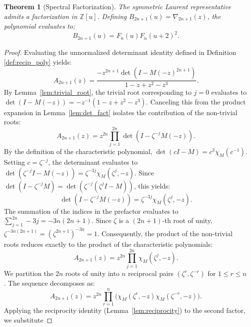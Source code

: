 \documentclass[11pt]{article}
\newtheorem{theorem}{Theorem}[section]
\begin{document}
\begin{theorem}[Spectral Factorization]\label{thm:spectral_fact}
The symmetric Laurent representative admits a factorization in $\mathbb{Z}[u]$. Defining $B_{2n+1}(u) = \nabla_{2n+1}(z)$, the polynomial evaluates to:
\begin{equation}
B_{2n+1}(u) = F_n(u)F_n(u+2)^2.
\end{equation}
\end{theorem}

\begin{proof}
Evaluating the unnormalized determinant identity defined in Definition \ref{def:recip_poly} yields:
\begin{equation*}
A_{2n+1}(z) = \frac{-z^{2n+1} \det(I - M(-z)^{2n+1})}{1-z+z^2-z^3}.
\end{equation*}
By Lemma~\ref{lem:trivial_root}, the trivial root corresponding to $j=0$ evaluates to $\det(I-M(-z)) = -z^{-1}(1-z+z^2-z^3)$. Canceling this from the product expansion in Lemma~\ref{lem:det_fact} isolates the contribution of the non-trivial roots:
\begin{equation*}
A_{2n+1}(z) = z^{2n} \prod_{j=1}^{2n} \det(I - \zeta^{-j}M(-z)).
\end{equation*}
By the definition of the characteristic polynomial, $\det(cI - M) = c^3\chi_M(c^{-1})$. Setting $c = \zeta^{-j}$, the determinant evaluates to $\det(\zeta^{-j}I - M(-z)) = \zeta^{-3j}\chi_M(\zeta^j, -z)$. Since $\det(I - \zeta^{-j}M) = \det(\zeta^{-j}(\zeta^j I - M))$, this yields:
\begin{equation*}
\det(I - \zeta^{-j}M(-z)) = \zeta^{-3j}\chi_M(\zeta^j, -z).
\end{equation*}
The summation of the indices in the prefactor evaluates to $\sum_{j=1}^{2n} -3j = -3n(2n+1)$. Since $\zeta$ is a $(2n+1)$-th root of unity, $\zeta^{-3n(2n+1)} = (\zeta^{2n+1})^{-3n} = 1$. Consequently, the product of the non-trivial roots reduces exactly to the product of the characteristic polynomials:
\begin{equation*}
A_{2n+1}(z) = z^{2n} \prod_{j=1}^{2n} \chi_M(\zeta^j, -z).
\end{equation*}
We partition the $2n$ roots of unity into $n$ reciprocal pairs $(\zeta^r, \zeta^{-r})$ for $1 \le r \le n$. The sequence decomposes as:
\begin{equation*}
A_{2n+1}(z) = z^{2n} \prod_{r=1}^{n} \Big( \chi_M(\zeta^r, -z) \chi_M(\zeta^{-r}, -z) \Big).
\end{equation*}
Applying the reciprocity identity (Lemma~\ref{lem:reciprocity}) to the second factor, we substitute \newline

\end{proof}
\end{document}
